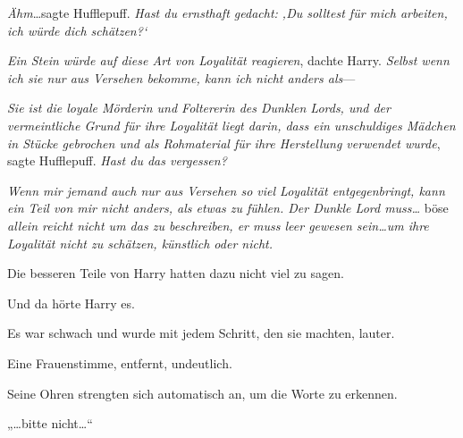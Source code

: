 \emph{Ähm}…sagte Hufflepuff. \emph{Hast du ernsthaft gedacht: ‚Du solltest für mich arbeiten, ich würde dich schätzen?`}

\emph{Ein Stein würde auf diese Art von Loyalität reagieren}, dachte Harry. \emph{Selbst wenn ich sie nur aus Versehen bekomme, kann ich nicht anders als}—

\emph{Sie ist die loyale Mörderin und Foltererin des Dunklen Lords, und der vermeintliche Grund für ihre Loyalität liegt darin, dass ein unschuldiges Mädchen in Stücke gebrochen und als Rohmaterial für ihre Herstellung verwendet wurde}, sagte Hufflepuff. \emph{Hast du das vergessen?}

\emph{Wenn mir jemand auch nur aus Versehen so viel Loyalität entgegenbringt, kann ein Teil von mir nicht anders, als etwas zu fühlen. Der Dunkle Lord muss…} böse \emph{allein reicht nicht um das zu beschreiben, er muss leer gewesen sein…um ihre Loyalität nicht zu schätzen, künstlich oder nicht.}

Die besseren Teile von Harry hatten dazu nicht viel zu sagen.

Und da hörte Harry es.

Es war schwach und wurde mit jedem Schritt, den sie machten, lauter.

Eine Frauenstimme, entfernt, undeutlich.

Seine Ohren strengten sich automatisch an, um die Worte zu erkennen.

„…bitte nicht…“

